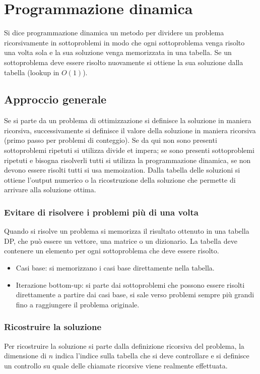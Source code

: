 \chapter{Programmazione dinamica}
Si dice programmazione dinamica un metodo per dividere un problema ricorsivamente in sottoproblemi in modo che ogni sottoproblema venga risolto una volta sola e la sua soluzione venga memorizzata in
una tabella. Se un sottoproblema deve essere risolto nuovamente si ottiene la sua soluzione dalla tabella (lookup in $O(1)$).
\section{Approccio generale}
Se si parte da un problema di ottimizzazione si definisce la soluzione in maniera ricorsiva, successivamente si definisce il valore della soluzione in maniera ricorsiva (primo passo per problemi di conteggio). Se da
qui non sono presenti sottoproblemi ripetuti si utilizza divide et impera; se sono presenti sottoproblemi ripetuti e bisogna risolverli tutti si utilizza la programmazione dinamica, se non devono essere risolti tutti
si usa memoization. Dalla tabella delle soluzioni si ottiene l'output numerico o la ricostruzione della soluzione che permette di arrivare alla soluzione ottima. 
\subsection{Evitare di risolvere i problemi pi\`u di una volta}
Quando si risolve un problema si memorizza il risultato ottenuto in una tabella DP, che pu\`o essere un vettore, una matrice o un dizionario. La tabella deve contenere un elemento per ogni sottoproblema che
deve essere risolto.
\begin{itemize}
\item Casi base: si memorizzano i casi base direttamente nella tabella.
\item Iterazione bottom-up: si parte dai sottoproblemi che possono essere risolti direttamente a partire dai casi base, si sale verso problemi sempre pi\`u grandi fino a raggiungere il problema originale. 
\end{itemize} 
\subsection{Ricostruire la soluzione}
Per ricostruire la soluzione si parte dalla definizione ricorsiva del problema, la dimensione di $n$ indica l'indice sulla tabella che si deve controllare e si definisce un controllo su quale delle chiamate ricorsive 
viene realmente effettuata.
